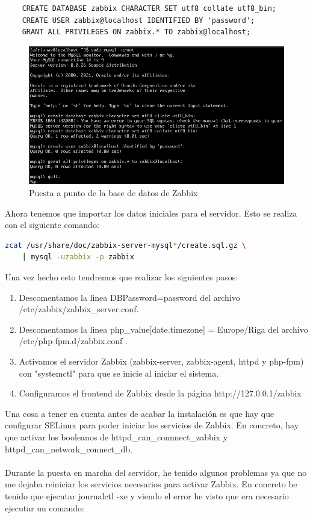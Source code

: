 \begin{lstlisting}
	CREATE DATABASE zabbix CHARACTER SET utf8 collate utf8_bin;
	CREATE USER zabbix@localhost IDENTIFIED BY 'password';
	GRANT ALL PRIVILEGES ON zabbix.* TO zabbix@localhost;
\end{lstlisting} 

\begin{figure}[H]
	\centering 
	\includegraphics[scale=0.5]{graphics/img4} 
	\caption{Puesta a punto de la base de datos de Zabbix} 
\end{figure} 
Ahora tenemos que importar los datos iniciales para el servidor. Esto se realiza con el siguiente comando: 
\begin{lstlisting}[language=bash] 
	zcat /usr/share/doc/zabbix-server-mysql*/create.sql.gz \
	| mysql -uzabbix -p zabbix 
\end{lstlisting} 

Una vez hecho esto tendremos que realizar los siguientes pasos: 

\begin{enumerate} 
	\item Descomentamos la linea DBPassword=password del archivo /etc/zabbix/zabbix\_server.conf.

	\item Descomentamos la linea php\_value[date.timezone] = Europe/Riga del archivo /etc/php-fpm.d/zabbix.conf .

	\item Activamos el servidor Zabbix (zabbix-server, zabbix-agent, httpd y php-fpm) con "systemctl" para que se inicie al iniciar el sistema. 
	\item Configuramos el frontend de Zabbix desde la página http://127.0.0.1/zabbix
\end{enumerate}

Una cosa a tener en cuenta antes de acabar la instalación es que hay que configurar SELinux para poder iniciar los servicios de Zabbix. En concreto, hay que activar los booleanos de httpd\_can\_connnect\_zabbix y httpd\_can\_network\_connect\_db.
\\\\
Durante la puesta en marcha del servidor, he tenido algunos problemas ya que no me dejaba reiniciar los servicios necesarios para activar Zabbix. En concreto he tenido que ejecutar journalctl -xe y viendo el error he visto que era necesario ejecutar un comando:


